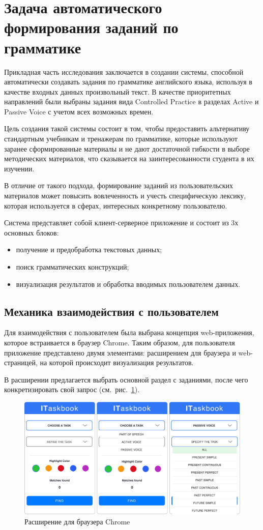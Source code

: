 \section{Задача автоматического формирования заданий по грамматике}
Прикладная часть исследования заключается в создании системы, способной автоматически создавать задания по грамматике английского языка, используя в качестве входных данных произвольный текст. В качестве приоритетных направлений были выбраны задания вида Controlled Practice в разделах Active и Passive Voice с учетом всех возможных времен. 

Цель создания такой системы состоит в том, чтобы предоставить альтернативу стандартным учебникам и тренажерам по грамматике, которые используют заранее сформированные материалы и не дают достаточной гибкости в выборе методических материалов, что сказывается на заинтересованности студента в их изучении. 

В отличие от такого подхода, формирование заданий из пользовательских материалов может повысить вовлеченность и учесть специфическую лексику, которая используется в сферах, интересных конкретному пользователю.

Система представляет собой клиент-серверное приложение и состоит из 3х основных блоков:
\begin{itemize}
  \item получение и предобработка текстовых данных;
  \item поиск грамматических конструкций;
  \item визуализация результатов и обработка вводимых пользователем данных.
\end{itemize}

\subsection{Механика взаимодействия с пользователем}
Для взаимодействия с пользователем была выбрана концепция web-приложения, которое встраивается в браузер Chrome. Таким образом, для пользователя приложение представлено двумя элементами: расширением для браузера и web-страницей, на которой происходит визуализация результатов. 

В расширении предлагается выбрать основной раздел с заданиями, после чего конкретизировать свой запрос (см.~рис.~\ref{fig:ext}). 
\begin{figure}[h]
\centering
\includegraphics[width=\textwidth]{img/ext}
\caption{\label{fig:ext}Расширение для браузера Chrome}
\end{figure}

